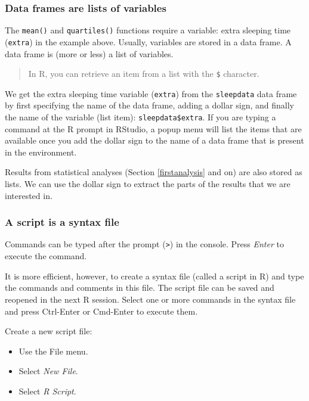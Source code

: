 \documentclass[doc,floatsintext]{apa6}
\providecommand{\tightlist}{%
  \setlength{\itemsep}{0pt}\setlength{\parskip}{0pt}}
\begin{document}
\subsubsection{Data frames are lists of
variables}\label{data-frames-are-lists-of-variables}

The \texttt{mean()} and \texttt{quartiles()} functions require a
variable: extra sleeping time (\texttt{extra}) in the example above.
Usually, variables are stored in a data frame. A data frame is (more or
less) a list of variables.

\begin{quote}
In R, you can retrieve an item from a list with the \texttt{\$}
character.
\end{quote}

We get the extra sleeping time variable (\texttt{extra}) from the
\texttt{sleepdata} data frame by first specifying the name of the data
frame, adding a dollar sign, and finally the name of the variable (list
item): \texttt{sleepdata\$extra}. If you are typing a command at the R
prompt in RStudio, a popup menu will list the items that are available
once you add the dollar sign to the name of a data frame that is present
in the environment.

Results from statistical analyses (Section \ref{firstanalysis} and on)
are also stored as lists. We can use the dollar sign to extract the
parts of the results that we are interested in.

\subsubsection{A script is a syntax file}\label{scriptfile}

Commands can be typed after the prompt (\texttt{\textgreater{}}) in the
console. Press \emph{Enter} to execute the command.

It is more efficient, however, to create a syntax file (called a script
in R) and type the commands and comments in this file. The script file
can be saved and reopened in the next R session. Select one or more
commands in the syntax file and press Ctrl-Enter or Cmd-Enter to execute
them.

Create a new script file:

\begin{itemize}
\tightlist
\item
  Use the File menu.
\item
  Select \emph{New File}.
\item
  Select \emph{R Script}.
\end{itemize}
\end{document}
